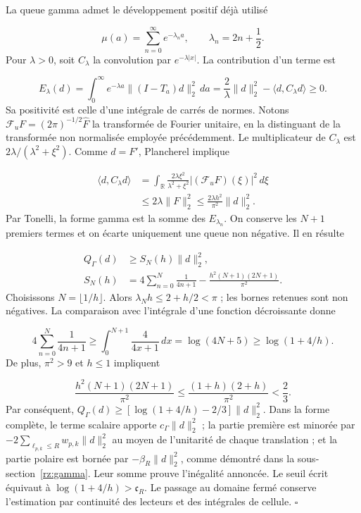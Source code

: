 La queue gamma admet le développement positif déjà utilisé

\[
\mu(a)=\sum_{n=0}^{\infty}e^{-\lambda_n a},
\qquad \lambda_n=2n+\frac12.
\]
Pour \(\lambda>0\), soit \(C_\lambda\) la convolution par \(e^{-\lambda|x|}\). La contribution d’un terme est

\[
E_\lambda(d)=\int_0^\infty e^{-\lambda a}
\|(I-T_a)d\|_2^2\,da
=\frac2\lambda\|d\|_2^2-
\langle d,C_\lambda d\rangle\geq0.
\]
Sa positivité est celle d'une intégrale de carrés de normes. Notons \(\mathcal F_u F=(2\pi)^{-1/2}\widehat F\) la transformée de Fourier unitaire, en la distinguant de la transformée non normalisée employée précédemment. Le multiplicateur de \(C_\lambda\) est \(2\lambda/(\lambda^2+\xi^2)\). Comme \(d=F'\), Plancherel implique

\[
\begin{aligned}
\langle d,C_\lambda d\rangle
&=\int_{\mathbb R}
\frac{2\lambda\xi^2}{\lambda^2+\xi^2}
|(\mathcal F_u F)(\xi)|^2\,d\xi\\
&\leq2\lambda\|F\|_2^2
\leq\frac{2\lambda h^2}{\pi^2}\|d\|_2^2.
\end{aligned}
\]
Par Tonelli, la forme gamma est la somme des \(E_{\lambda_n}\). On conserve les \(N+1\) premiers termes et on écarte uniquement une queue non négative. Il en résulte

\[
\begin{aligned}
Q_\Gamma(d)&\geq S_N(h)\|d\|_2^2,\\
S_N(h)&=4\sum_{n=0}^N\frac1{4n+1}
-\frac{h^2(N+1)(2N+1)}{\pi^2}.
\end{aligned}
\]
Choisissons \(N=\lfloor1/h\rfloor\). Alors \(\lambda_N h\leq2+h/2<\pi\) ; les bornes retenues sont non négatives. La comparaison avec l’intégrale d’une fonction décroissante donne

\[
4\sum_{n=0}^N\frac1{4n+1}
\geq\int_0^{N+1}\frac4{4x+1}\,dx
=\log(4N+5)\geq\log(1+4/h).
\]
De plus, \(\pi^2>9\) et \(h\leq1\) impliquent

\[
\frac{h^2(N+1)(2N+1)}{\pi^2}
\leq\frac{(1+h)(2+h)}{\pi^2}<\frac23.
\]
Par conséquent, \(Q_\Gamma(d)\geq[\log(1+4/h)-2/3]\|d\|_2^2\). Dans la forme complète, le terme scalaire apporte \(c_\Gamma\|d\|_2^2\) ; la partie première est minorée par \(-2\sum_{\ell_{p,k}\leq R}w_{p,k}\|d\|_2^2\) au moyen de l’unitarité de chaque translation ; et la partie polaire est bornée par \(-\beta_R\|d\|_2^2\), comme démontré dans la sous-section~\ref{rz:gamma}. Leur somme prouve l’inégalité annoncée. Le seuil écrit équivaut à \(\log(1+4/h)>\mathfrak c_R\). Le passage au domaine fermé conserve l’estimation par continuité des lecteurs et des intégrales de cellule. \hfill\(\square\)

